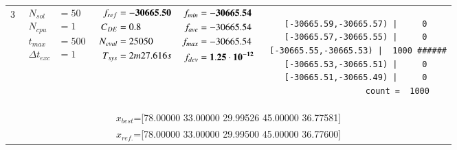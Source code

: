 \begin{table*} [!t]
\begin{tabular}[c]{ccccc}
3
&
{$\!\begin{aligned}
    N_{sol}        &= 50 \\
	N_{cpu}        &= 1 \\
	t_{max}        &= 500 \\
	\Delta t_{exc} &= 1
\end{aligned}$}
&
{$\!\begin{aligned}
	f_{ref} &= {\bf -30665.50} \\
	C_{DE}   &= 0.8 \\
	N_{eval} &= 25050 \\
	T_{sys}  &= 2m27.616s
\end{aligned}$}
&
{$\!\begin{aligned}
    f_{min} &= {\bf -30665.54} \\
    f_{ave} &= -30665.54 \\
    f_{max} &= -30665.54 \\
    f_{dev} &= {\bf 1.25\cdot 10^{-12}}
\end{aligned}$}
&
\begin{minipage}{4.1cm} \fontsize{5pt}{6pt}
\begin{verbatim}
 [-30665.59,-30665.57) |     0 
 [-30665.57,-30665.55) |     0 
 [-30665.55,-30665.53) |  1000 ######
 [-30665.53,-30665.51) |     0 
 [-30665.51,-30665.49) |     0 
                 count =  1000
 \end{verbatim}
\end{minipage} \\
\multicolumn{5}{c}{{\scriptsize $x_{best}$=[78.00000 33.00000 29.99526 45.00000 36.77581]}} \\
\multicolumn{5}{c}{{\scriptsize $x_{ref.}$=[78.00000 33.00000 29.99500 45.00000 36.77600]}} \\

\hline




\end{tabular}
\end{table*}
